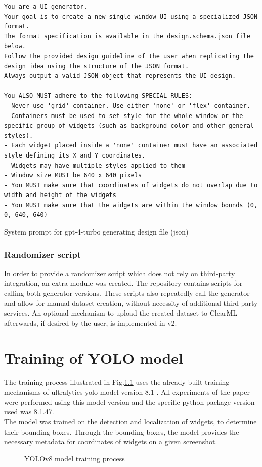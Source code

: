 \documentclass[Bachelor, BIC, english, fhCitStyle, IEEE]{BASE/twbook} %
\newcommand{\nocontentsline}[3]{}
\newcommand{\hidsubsection}[1]{\bgroup\let\addcontentsline=\nocontentsline\subsection{#1}\egroup}
\begin{document}
\begin{listing}[htbp]
    \begin{verbatim}
You are a UI generator.
Your goal is to create a new single window UI using a specialized JSON format.
The format specification is available in the design.schema.json file below.
Follow the provided design guideline of the user when replicating the design idea using the structure of the JSON format.
Always output a valid JSON object that represents the UI design.

You ALSO MUST adhere to the following SPECIAL RULES:
- Never use 'grid' container. Use either 'none' or 'flex' container.
- Containers must be used to set style for the whole window or the specific group of widgets (such as background color and other general styles).
- Each widget placed inside a 'none' container must have an associated style defining its X and Y coordinates.
- Widgets may have multiple styles applied to them
- Window size MUST be 640 x 640 pixels
- You MUST make sure that coordinates of widgets do not overlap due to width and height of the widgets
- You MUST make sure that the widgets are within the window bounds (0, 0, 640, 640)
    \end{verbatim}
    \caption{System prompt for gpt-4-turbo generating design file (\ac{json})}
    \label{code:gpt4-design-json-system-prompt}
\end{listing}
\hidsubsection{Randomizer script}
\noindent
In order to provide a randomizer script which does not rely on third-party integration, an extra module was created. The repository \autocite{HackXItUi_randomizer14d441c38a37850f4809471124bea3c36b9bc0b7} contains scripts for calling both generator versions. These scripts also repeatedly call the generator and allow for manual dataset creation, without necessity of additional third-party services. An optional mechanism to upload the created dataset to ClearML afterwards, if desired by the user, is implemented in v2.
\newpage
\chapter{Training of YOLO model}
The training process illustrated in Fig.\ref{fig:yolo-train} uses the already built training mechanisms of ultralytics \autocite{jocherUltralyticsYOLO2023} \ac{yolo} model version 8.1 \autocite{UltralyticsUltralyticsV8}. All experiments of the paper were performed using this model version and the specific python package version used was 8.1.47.\\
The model was trained on the detection and localization of widgets, to determine their bounding boxes. Through the bounding boxes, the model provides the necessary metadata for coordinates of widgets on a given screenshot.
\begin{figure}[!htbp]
    \caption{YOLOv8 model training process}
    \centering
    
    \label{fig:yolo-train}
\end{figure}
\end{document}
